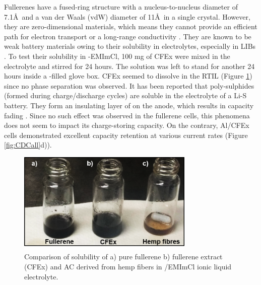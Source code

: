 \documentclass{article}
\begin{document}
Fullerenes have a fused-ring structure with a nucleus-to-nucleus diameter of 7.1\AA\ and a van der Waals (vdW) diameter of 11\AA\ in a single crystal. However, they are zero-dimensional materials, which means they cannot provide an efficient path for electron transport or a long-range conductivity \cite{loutfy_fullerene_2002, winkler_two-component_2007}. They are known to be weak battery materials owing to their solubility in electrolytes, especially in LIBs \cite{seger_prospects_1991}. To test their solubility in -EMImCl, 100 mg of CFEx were mixed in the electrolyte and stirred for 24 hours. The solution was left to stand for another 24 hours inside a -filled glove box. CFEx seemed to dissolve in the RTIL (Figure \ref{fig:CFExsol}) since no phase separation was observed. It has been reported that poly-sulphides (formed during charge/discharge cycles) are soluble in the electrolyte of a Li-S battery. They form an insulating layer of  on the anode, which results in capacity fading \cite{sun_effect_2017}. Since no such effect was observed in the fullerene cells, this phenomena does not seem to impact its charge-storing capacity. On the contrary, Al/CFEx cells demonstrated excellent capacity retention at various current rates (Figure \ref{fig:CDCall}d)).   

\begin{figure}
\centering
\includegraphics[width=0.75\textwidth]{fig/CFExsol}
\caption{Comparison of solubility of a) pure  fullerene b) fullerene extract (CFEx) and AC derived from hemp fibers in /EMImCl ionic liquid electrolyte.}
\label{fig:CFExsol}
\end{figure}
\end{document}
